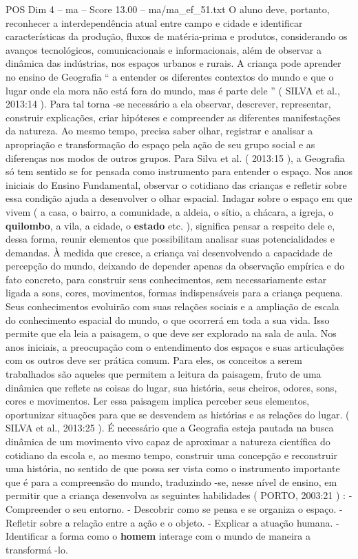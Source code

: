 \begin{textsample}{POS Dim 4 – ma – Score 13.00 – ma/ma\_ef\_51.txt}
O aluno deve, portanto, reconhecer a interdependência atual entre campo e cidade e identificar características da produção, fluxos de matéria-prima e produtos, considerando os avanços tecnológicos, comunicacionais e informacionais, além de observar a dinâmica das indústrias, nos espaços urbanos e rurais.
A criança pode aprender no ensino de Geografia “ a entender os diferentes contextos do mundo e que o lugar onde ela mora não está fora do mundo, mas é parte dele ” ( SILVA et al., 2013:14 ).
Para tal torna -se necessário a ela observar, descrever, representar, construir explicações, criar hipóteses e compreender as diferentes manifestações da natureza.
Ao mesmo tempo, precisa saber olhar, registrar e analisar a apropriação e transformação do espaço pela ação de seu grupo social e as diferenças nos modos de outros grupos.
Para Silva et al. ( 2013:15 ), a Geografia só tem sentido se for pensada como instrumento para entender o espaço.
Nos anos iniciais do Ensino Fundamental, observar o cotidiano das crianças e refletir sobre essa condição ajuda a desenvolver o olhar espacial.
Indagar sobre o espaço em que vivem ( a casa, o bairro, a comunidade, a aldeia, o sítio, a chácara, a igreja, o \textbf{quilombo}, a vila, a cidade, o \textbf{estado} etc. ), significa pensar a respeito dele e, dessa forma, reunir elementos que possibilitam analisar suas potencialidades e demandas.
À medida que cresce, a criança vai desenvolvendo a capacidade de percepção do mundo, deixando de depender apenas da observação empírica e do fato concreto, para construir seus conhecimentos, sem necessariamente estar ligada a sons, cores, movimentos, formas indispensáveis para a criança pequena.
Seus conhecimentos evoluirão com suas relações sociais e a ampliação de escala do conhecimento espacial do mundo, o que ocorrerá em toda a sua vida.
Isso permite que ela leia a paisagem, o que deve ser explorado na sala de aula.
Nos anos iniciais, a preocupação com o entendimento dos espaços e suas articulações com os outros deve ser prática comum.
Para eles, os conceitos a serem trabalhados são aqueles que permitem a leitura da paisagem, fruto de uma dinâmica que reflete as coisas do lugar, sua história, seus cheiros, odores, sons, cores e movimentos.
Ler essa paisagem implica perceber seus elementos, oportunizar situações para que se desvendem as histórias e as relações do lugar. ( SILVA et al., 2013:25 ).
É necessário que a Geografia esteja pautada na busca dinâmica de um movimento vivo capaz de aproximar a natureza científica do cotidiano da escola e, ao mesmo tempo, construir uma concepção e reconstruir uma história, no sentido de que possa ser vista como o instrumento importante que é para a compreensão do mundo, traduzindo -se, nesse nível de ensino, em permitir que a criança desenvolva as seguintes habilidades ( PORTO, 2003:21 ) : - Compreender o seu entorno. - Descobrir como se pensa e se organiza o espaço. - Refletir sobre a relação entre a ação e o objeto. - Explicar a atuação humana. - Identificar a forma como o \textbf{homem} interage com o mundo de maneira a transformá -lo.

\end{textsample}
